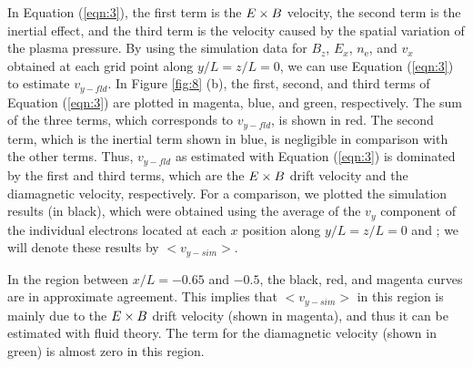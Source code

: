 \documentclass[draft,jgrga]{agutex2015}
\begin{document}
\begin{article}
In Equation (\ref{eqn:3}), 
the first term is 
the $\mbox{\boldmath $E$} \times \mbox{\boldmath $B$}$ velocity,
the second term is the inertial effect, and the third term is the velocity caused 
by the spatial variation of the plasma pressure. 
By using the simulation data for $B_z$, $E_x$, $n_\mathrm{e}$, 
and $v_x$ obtained at each grid point along $y/L=z/L=0$, 
we can use Equation (\ref{eqn:3}) to estimate $v_{y-fld}$. 
In Figure \ref{fig:8} (b), 
the first, second, and third terms of Equation (\ref{eqn:3}) are plotted 
in magenta, blue, and green, respectively.  
The sum of the three terms, which corresponds to $v_{y-fld}$,
is shown in red. 
The second term, which is the inertial term shown in blue, is negligible 
in comparison with the other terms. 
Thus, $v_{y-fld}$ as estimated with Equation (\ref{eqn:3}) is 
dominated by the first and third terms,
which are 
the $\mbox{\boldmath $E$} \times \mbox{\boldmath $B$}$ drift velocity
and the diamagnetic velocity, respectively. 
For a comparison, 
we plotted the simulation results (in black), which were obtained 
using the average of the $v_y$ component of the individual electrons
located at each $x$ position along $y/L=z/L=0$ and ; we will denote 
these results by $<v_{y-sim}>$. 

In the region between $x/L=-0.65$ and $-0.5$, 
the black, red, and magenta curves are in approximate agreement. 
This implies that $<v_{y-sim}>$ in this region 
is mainly due to 
the $\mbox{\boldmath $E$} \times \mbox{\boldmath $B$}$ drift velocity
(shown in magenta),
and thus it can be estimated with fluid theory. 
The term for the diamagnetic velocity (shown in green) is almost zero 
in this region.  


\end{article}
\end{document}
